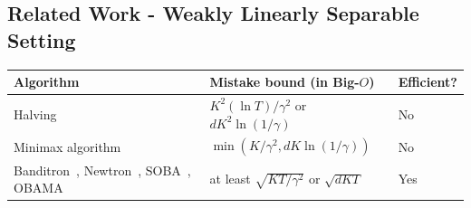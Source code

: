 \documentclass[landscape,a0a,final]{a0poster}
\begin{document}
\begin{multicols}{3}
\section*{Related Work - Weakly Linearly Separable Setting}
\centering
\begin{tabular}{|L{14cm}||C{14cm}|C{4cm}|}
\hline
Algorithm & Mistake bound (in Big-$O$) & Efficient? \\
\hline
Halving~\citep{Kakade-Shalev-Shwartz-Tewari-2008} & $K^2(\ln T)/\gamma^2$ or $dK^2 \ln(1/\gamma)$ & No \\
\hline
Minimax algorithm~\citep{Daniely-Helbertal-2013} & \vspace*{\fill}$\min(K/\gamma^2, dK\ln (1/\gamma))$\vspace*{\fill}  & \vspace*{\fill} No \vspace*{\fill} \\
\hline
Banditron~\citep{Kakade-Shalev-Shwartz-Tewari-2008},
Newtron~\citep{Hazan-Kale-2011},
SOBA~\citep{Beygelzimer-Orabona-Zhang-2017},
OBAMA~\citep{Foster-Kale-Luo-Mohri-Sridharan-2018}
& \vspace*{\fill} at least $\sqrt{KT/\gamma^2}$ or $\sqrt{dKT}$ \vspace*{\fill}
& \vspace*{\fill} Yes \vspace*{\fill} \\
\hline
\end{tabular}



\end{multicols}
\end{document}
